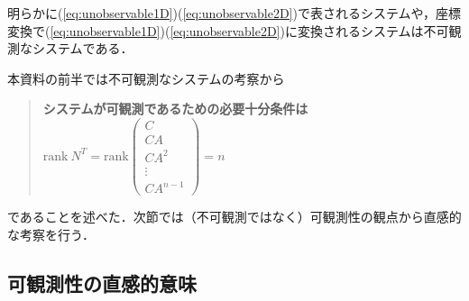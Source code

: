 明らかに(\ref{eq:unobservable1D})(\ref{eq:unobservable2D})で表されるシステムや，座標変換で(\ref{eq:unobservable1D})(\ref{eq:unobservable2D})に変換されるシステムは不可観測なシステムである．

本資料の前半では不可観測なシステムの考察から
\begin{quote}
	{\bf システムが可観測であるための必要十分条件は
	$\mbox{rank}\ N^T 
	= \mbox{rank} 
	  \left(\begin{array}{c}
	         C        \\
		 C A      \\
		 C A^2    \\
		 \vdots   \\
		 C A^{n-1}
		\end{array}\right)
	= n$}
\end{quote}
であることを述べた．次節では（不可観測ではなく）可観測性の観点から直感的な考察を行う．

\subsection{可観測性の直感的意味}


